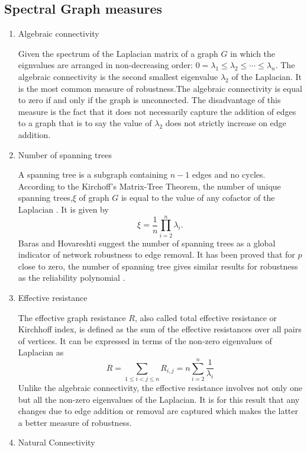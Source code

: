 \documentclass[10pt,a4paper]{article}
\begin{document}
	\subsection{Spectral Graph measures}
	\begin{enumerate}
		\item Algebraic connectivity
		
		Given the spectrum of the Laplacian matrix of a graph $G$ in which the eignvalues are arranged in non-decreasing order: $0=\lambda_1\leq \lambda_2 \leq \cdots \leq \lambda_n$. The algebraic connectivity is the second smallest eigenvalue $\lambda_2$ of the Laplacian. It is the most common measure of robustness.The algebraic connectivity is equal to zero if and only if the graph is unconnected. The disadvantage of this measure is the fact that it does not necessarily capture the addition of edges to a graph that is to say the value of $\lambda_2$ does not strictly increase on edge addition.
		\item Number of spanning trees
				
		A spanning tree is a subgraph containing $n-1$ edges and no cycles. According to the Kirchoff's Matrix-Tree Theorem, the number of unique spanning trees,$\xi$ of graph $G$ is equal to the value of any cofactor of the Laplacian \citep{harris2008combinatorics}. It  is given by
		\begin{equation}
		\xi = \frac{1}{n} \prod_{i=2}^{n} \lambda_i.
		\end{equation}
		Baras and Hovareshti suggest the number of spanning trees as a global indicator of network robustness to edge removal. It has been proved that for $p$ close to zero, the number of spanning tree gives similar results for robustness as the reliability polynomial \citep{baras2009efficient}.
		\item Effective resistance
		
		The effective graph resistance $R$, also called total effective resistance or Kirchhoff index, is
		defined as the sum of the effective resistances over all pairs of vertices. It can be expressed in terms of the non-zero eigenvalues of Laplacian as
		\begin{equation}
		R = \sum_{1\leq i < j \leq n} R_{i,j} = n \sum_{i=2}^{n} \frac{1}{\lambda_i}
		\end{equation}
		Unlike the algebraic connectivity, the effective resistance involves not only one but all the non-zero eigenvalues of the Laplacian. It is for this result that any changes due to edge addition or removal are captured which makes the latter a better measure of robustness.
		\item Natural Connectivity
		

\end{enumerate}
\end{document}
